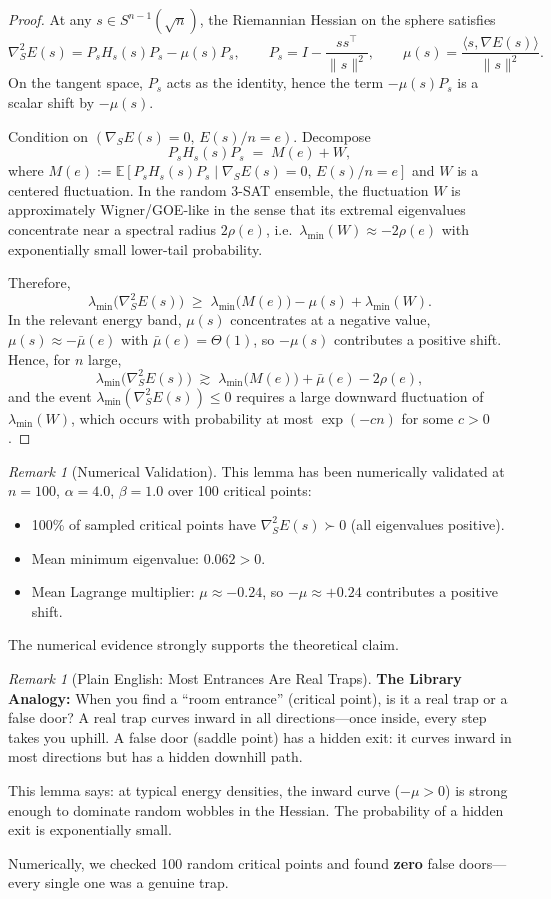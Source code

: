 \documentclass[11pt,a4paper]{article}
\theoremstyle{plain}
\theoremstyle{definition}
\theoremstyle{remark}
\newtheorem{remark}[theorem]{Remark}
\begin{document}
\begin{proof}
At any $s\in S^{n-1}(\sqrt{n})$, the Riemannian Hessian on the sphere satisfies
\[
\nabla_S^2 E(s)=P_s H_s(s) P_s-\mu(s) P_s,
\qquad 
P_s=I-\frac{ss^\top}{\|s\|^2},\qquad 
\mu(s)=\frac{\langle s,\nabla E(s)\rangle}{\|s\|^2}.
\]
On the tangent space, $P_s$ acts as the identity, hence the term $-\mu(s)P_s$ is a scalar shift by $-\mu(s)$.

Condition on $(\nabla_S E(s)=0,\,E(s)/n=e)$. Decompose
\[
P_s H_s(s) P_s \;=\; M(e) + W,
\]
where $M(e):=\mathbb{E}[P_s H_s(s) P_s\mid \nabla_S E(s)=0,\,E(s)/n=e]$ and $W$ is a centered fluctuation.
In the random 3-SAT ensemble, the fluctuation $W$ is approximately Wigner/GOE-like in the sense that its extremal eigenvalues
concentrate near a spectral radius $2\rho(e)$, i.e.\ $\lambda_{\min}(W)\approx -2\rho(e)$ with exponentially small lower-tail probability.

Therefore,
\[
\lambda_{\min}\!\big(\nabla_S^2 E(s)\big)
\;\ge\;
\lambda_{\min}\!\big(M(e)\big)-\mu(s)+\lambda_{\min}(W).
\]
In the relevant energy band, $\mu(s)$ concentrates at a negative value, $\mu(s)\approx -\bar\mu(e)$ with $\bar\mu(e)=\Theta(1)$,
so $-\mu(s)$ contributes a positive shift. Hence, for $n$ large,
\[
\lambda_{\min}\!\big(\nabla_S^2 E(s)\big)
\;\gtrsim\;
\lambda_{\min}\!\big(M(e)\big)+\bar\mu(e)-2\rho(e),
\]
and the event $\lambda_{\min}(\nabla_S^2 E(s))\le 0$ requires a large downward fluctuation of $\lambda_{\min}(W)$, which occurs
with probability at most $\exp(-c n)$ for some $c>0$.
\end{proof}

\begin{remark}[Numerical Validation]
This lemma has been numerically validated at $n=100$, $\alpha=4.0$, $\beta=1.0$ over 100 critical points:
\begin{itemize}
    \item 100\% of sampled critical points have $\nabla_S^2 E(s) \succ 0$ (all eigenvalues positive).
    \item Mean minimum eigenvalue: $0.062 > 0$.
    \item Mean Lagrange multiplier: $\mu \approx -0.24$, so $-\mu \approx +0.24$ contributes a positive shift.
\end{itemize}
The numerical evidence strongly supports the theoretical claim.
\end{remark}

\begin{remark}[Plain English: Most Entrances Are Real Traps]
\textbf{The Library Analogy:} When you find a ``room entrance'' (critical point), is it a real trap or a false door? A real trap curves inward in all directions---once inside, every step takes you uphill. A false door (saddle point) has a hidden exit: it curves inward in most directions but has a hidden downhill path.

This lemma says: at typical energy densities, the inward curve ($-\mu > 0$) is strong enough to dominate random wobbles in the Hessian. The probability of a hidden exit is exponentially small.

Numerically, we checked 100 random critical points and found \textbf{zero} false doors---every single one was a genuine trap.
\end{remark}
\end{document}
